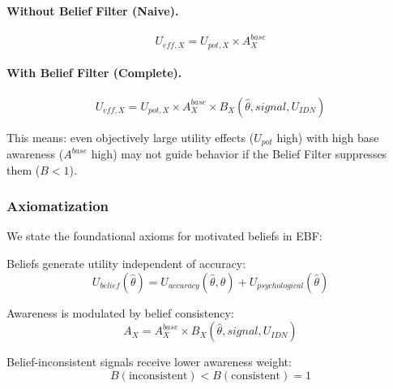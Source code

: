 \paragraph{Without Belief Filter (Naive).}
\begin{equation}
U_{eff,X} = U_{pot,X} \times A^{base}_X
\end{equation}

\paragraph{With Belief Filter (Complete).}
\begin{equation}
\boxed{
U_{eff,X} = U_{pot,X} \times A^{base}_X \times B_X(\hat{\theta}, signal, U_{IDN})
}
\label{eq:transformation-with-belief}
\end{equation}

This means: even objectively large utility effects ($U_{pot}$ high) with 
high base awareness ($A^{base}$ high) may not guide behavior if the Belief 
Filter suppresses them ($B < 1$).

\subsubsection{Axiomatization}
\label{subsubsec:axiomatization}

We state the foundational axioms for motivated beliefs in EBF:

\begin{tcolorbox}[colback=gray!5!white, colframe=gray!75!black, title=Axiom AWX-A03: Belief-Based Utility]
Beliefs generate utility independent of accuracy:
\begin{equation}
U_{belief}(\hat{\theta}) = U_{accuracy}(\hat{\theta}, \theta) + U_{psychological}(\hat{\theta})
\end{equation}
\end{tcolorbox}

\begin{tcolorbox}[colback=gray!5!white, colframe=gray!75!black, title=Axiom AWX-A04: Belief Filter]
Awareness is modulated by belief consistency:
\begin{equation}
A_X = A^{base}_X \times B_X(\hat{\theta}, signal, U_{IDN})
\end{equation}
\end{tcolorbox}

\begin{tcolorbox}[colback=gray!5!white, colframe=gray!75!black, title=Axiom AWX-A05: Asymmetric Processing]
Belief-inconsistent signals receive lower awareness weight:
\begin{equation}
B(\text{inconsistent}) < B(\text{consistent}) = 1
\end{equation}
\end{tcolorbox}

